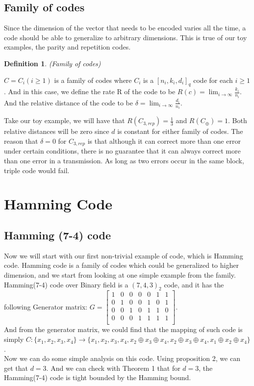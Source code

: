 \documentclass{article}
\newtheorem{Definition}{Definition}
\begin{document}
\subsection{Family of codes}
Since the dimension of the vector that needs to be encoded varies all the time, a code should be able to generalize to arbitrary dimensions. This is true of our toy examples, the parity and repetition codes.
\begin{Definition}(Family of codes)\end{Definition}
\noindent $C = C_i(i \ge 1)$ is a family of codes where $C_i$ is a $[n_i,k_i,d_i]_q$ code for each $i \ge 1$. And in this case, we define the rate R of the code to be $ R(c) = \lim_{i\to\infty} \frac{k_i}{n_i}$. And the relative distance of the code to be $\delta = \lim_{i\to\infty} \frac{d_i}{n_i}$.

Take our toy example, we will have that $R(C_{3,rep}) = \frac{1}{3}$ and $R(C_\oplus) = 1$. Both relative distances will be zero since $d$ is constant for either family of codes. The reason that $\delta = 0$ for $C_{3,rep}$ is that although it can correct more than one error under certain conditions, there is no guarantee that it can always correct more than one error in a transmission. As long as two errors occur in the same block, triple code would fail.

\section{Hamming Code}
\subsection{Hamming (7-4) code}
Now we will start with our first non-trivial example of code, which is Hamming code. Hamming code is a family of codes which could be generalized to higher dimension, and we start from looking at one simple example from the family.\\
Hamming(7-4) code over Binary field is a $(7,4,3)_2$ code, and it has the following Generator matrix:
$G = \begin{bmatrix}
	1 & 0 & 0 & 0 & 0 & 1 & 1 \\
	0 & 1 & 0 & 0 & 1 & 0 & 1 \\
	0 & 0 & 1 & 0 & 1 & 1 & 0  \\
	0 & 0 & 0 & 1 & 1 & 1 & 1 \\
    \end{bmatrix}$.\\
And from the generator matrix, we could find that the mapping of such code is simply 
$C: \{x_1, x_2, x_3,x_4\} \rightarrow \{x_1,x_2,x_3,x_4, x_2\oplus x_3\oplus x_4,x_2\oplus x_3\oplus x_4,x_1\oplus x_2\oplus x_4\}$.\\
Now we can do some simple analysis on this code. Using proposition 2, we can get that $d = 3$. And we can check with Theorem 1 that for $d=3$, the Hamming(7-4) code is tight bounded by the Hamming bound.
\end{document}
